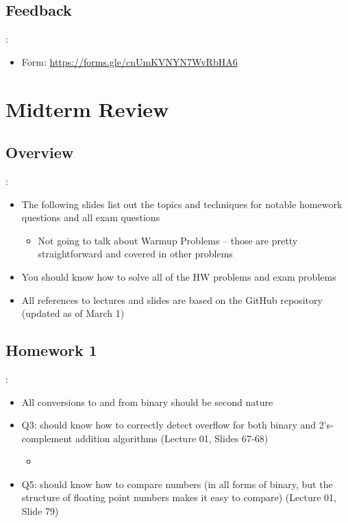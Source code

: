 \documentclass{../slides}
\begin{document}
\subsection{Feedback}
\begin{frame}{\secname: \subsecname}
    \begin{itemize}
        \item Form: \url{https://forms.gle/cnUmKVNYN7WvRbHA6}
    \end{itemize}
\end{frame}

\section{Midterm Review}
\subsection{Overview}
\begin{frame}{\secname: \subsecname}
    \begin{itemize}
        \item The following slides list out the topics and techniques for notable homework questions and all exam questions
        \begin{itemize}
            \item Not going to talk about Warmup Problems -- those are pretty straightforward and covered in other problems
        \end{itemize}
        \item You should know how to solve all of the HW problems and exam problems
        \item All references to lectures and slides are based on the GitHub repository (updated as of March 1)
    \end{itemize}
\end{frame}

\subsection{Homework 1}
\begin{frame}{\secname: \subsecname}
    \begin{itemize}
        \item All conversions to and from binary should be second nature
        \item Q3: should know how to correctly detect overflow for both binary and 2's-complement addition algorithms (Lecture 01, Slides 67-68)
        \begin{itemize}
            \item %
        \end{itemize}
        \item Q5: should know how to compare numbers (in all forms of binary, but the structure of floating point numbers makes it easy to compare) (Lecture 01, Slide 79)
    \end{itemize}
\end{frame}
\end{document}
